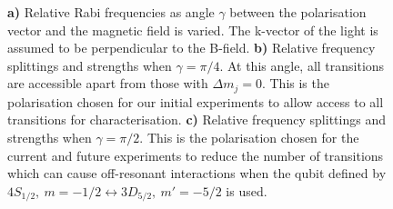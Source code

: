 \begin{figure}
{            \textbf{a)} Relative Rabi frequencies as angle $\gamma$ between the polarisation vector and the magnetic field is varied. The k-vector of the light is assumed to be perpendicular to the B-field.
            \textbf{b)} Relative frequency splittings and strengths when $\gamma = \pi/4$. At this angle, all transitions are accessible apart from those with $\Delta m_j = 0$. This is the polarisation chosen for our initial experiments to allow access to all transitions for characterisation.
            \textbf{c)} Relative frequency splittings and strengths when $\gamma = \pi/2$. This is the polarisation chosen for the current and future experiments to reduce the number of transitions which can cause off-resonant interactions when the qubit defined by $4S_{1/2},~m = -1/2 \leftrightarrow 3D_{5/2},~m' = -5/2$ is used.
            }
        \label{fig:quadrupole}
    \end{figure}


